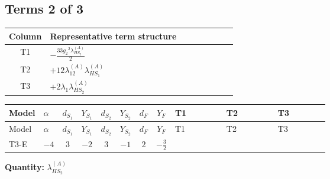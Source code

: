 \documentclass[8pt]{article}
\begin{document}
\begin{landscape}
\subsection*{Terms 2 of 3}
\begin{center}
\begin{tabular}{@{}c >{\raggedright\arraybackslash}p{0.82\linewidth}@{}}
\toprule
Column & Representative term structure \\
\midrule
T1 & \(\displaystyle -\frac{33 {g_2}^2 {\lambda_{HS_2}^{(A)}}}{2}\) \\
\midrule
T2 & \(\displaystyle +12 {\lambda_{12}^{(A)}} {\lambda_{HS_1}^{(A)}}\) \\
\midrule
T3 & \(\displaystyle +2 {\lambda_1} {\lambda_{HS_2}^{(A)}}\) \\
\midrule
\bottomrule
\end{tabular}
\end{center}
\smallskip
\tiny
\begin{longtable}{@{}llcccccc >{\raggedright\arraybackslash}p{0.21\linewidth} >{\raggedright\arraybackslash}p{0.21\linewidth} >{\raggedright\arraybackslash}p{0.21\linewidth}@{}}
\toprule
Model & $\alpha$ & $d_{S_1}$ & $Y_{S_1}$ & $d_{S_2}$ & $Y_{S_2}$ & $d_F$ & $Y_F$ & T1 & T2 & T3 \\
\midrule
\endfirsthead
\toprule
Model & $\alpha$ & $d_{S_1}$ & $Y_{S_1}$ & $d_{S_2}$ & $Y_{S_2}$ & $d_F$ & $Y_F$ & T1 & T2 & T3 \\
\midrule
\endhead
T3-E & $-4$ & $3$ & $-2$ & $3$ & $-1$ & $2$ & $-\frac{3}{2}$ & \scriptsize\adjustbox{max width=\linewidth}{$\begin{gathered} -\frac{33 {g_2}^2 {\lambda_{HS_2}^{(A)}}}{2}\end{gathered}$} & \scriptsize\adjustbox{max width=\linewidth}{$\begin{gathered} +12 {\lambda_{12}^{(A)}} {\lambda_{HS_1}^{(A)}}\end{gathered}$} & \scriptsize\adjustbox{max width=\linewidth}{$\begin{gathered} +2 {\lambda_1} {\lambda_{HS_2}^{(A)}}\end{gathered}$} \\
\midrule
\bottomrule
\end{longtable}
\clearpage
\noindent\textbf{Quantity: }$\lambda_{HS_2}^{(A)}$\par\smallskip

\end{landscape}
\end{document}
